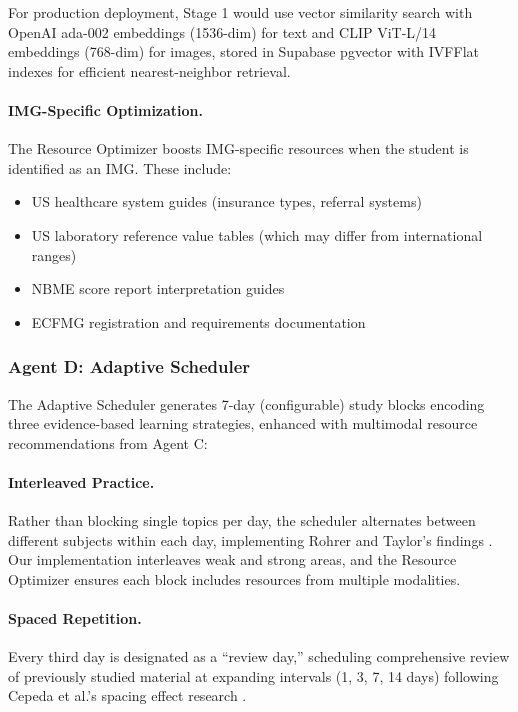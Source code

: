 For production deployment, Stage 1 would use vector similarity search with OpenAI ada-002 embeddings (1536-dim) for text and CLIP ViT-L/14 embeddings (768-dim) for images, stored in Supabase pgvector with IVFFlat indexes for efficient nearest-neighbor retrieval.

\paragraph{IMG-Specific Optimization.}
The Resource Optimizer boosts IMG-specific resources when the student is identified as an IMG. These include:
\begin{itemize}
    \item US healthcare system guides (insurance types, referral systems)
    \item US laboratory reference value tables (which may differ from international ranges)
    \item NBME score report interpretation guides
    \item ECFMG registration and requirements documentation
\end{itemize}

\subsubsection{Agent D: Adaptive Scheduler}

The Adaptive Scheduler generates 7-day (configurable) study blocks encoding three evidence-based learning strategies, enhanced with multimodal resource recommendations from Agent C:

\paragraph{Interleaved Practice.}
Rather than blocking single topics per day, the scheduler alternates between different subjects within each day, implementing Rohrer and Taylor's findings \cite{rohre2007interleaving}. Our implementation interleaves weak and strong areas, and the Resource Optimizer ensures each block includes resources from multiple modalities.

\paragraph{Spaced Repetition.}
Every third day is designated as a ``review day,'' scheduling comprehensive review of previously studied material at expanding intervals (1, 3, 7, 14 days) following Cepeda et al.'s spacing effect research \cite{cepeda2008spacing}.

